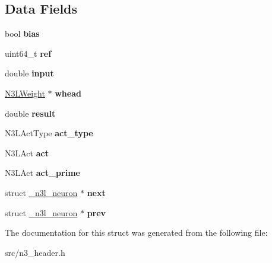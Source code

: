 \subsection*{Data Fields}
\begin{DoxyCompactItemize}
\item 
\mbox{\label{struct__n3l__neuron_a0f3291ff81ab13111e538622ab662069}} 
bool {\bfseries bias}
\item 
\mbox{\label{struct__n3l__neuron_aa0053e003b954df3b58853f003284958}} 
uint64\+\_\+t {\bfseries ref}
\item 
\mbox{\label{struct__n3l__neuron_ac896f5f8bd82c056cc61872120391048}} 
double {\bfseries input}
\item 
\mbox{\label{struct__n3l__neuron_ac9259a513822ea957c03430988adfa6a}} 
\hyperlink{struct__n3l__weight}{N3\+L\+Weight} $\ast$ {\bfseries whead}
\item 
\mbox{\label{struct__n3l__neuron_afc9c38f4676dbe2ead749f8b6c81f491}} 
double {\bfseries result}
\item 
\mbox{\label{struct__n3l__neuron_af424e7accb8d1d089b828a1de69e03a0}} 
N3\+L\+Act\+Type {\bfseries act\+\_\+type}
\item 
\mbox{\label{struct__n3l__neuron_a3ed17ddbe86d42ed6b7d31256b109262}} 
N3\+L\+Act {\bfseries act}
\item 
\mbox{\label{struct__n3l__neuron_a9c9de65191cb097fd7a71752c83fc3db}} 
N3\+L\+Act {\bfseries act\+\_\+prime}
\item 
\mbox{\label{struct__n3l__neuron_a55f1bc3d589d69c5a940d0cb497610c4}} 
struct \hyperlink{struct__n3l__neuron}{\+\_\+n3l\+\_\+neuron} $\ast$ {\bfseries next}
\item 
\mbox{\label{struct__n3l__neuron_a706ad4614fd4d1bd9a824f6ea8c0c9e5}} 
struct \hyperlink{struct__n3l__neuron}{\+\_\+n3l\+\_\+neuron} $\ast$ {\bfseries prev}
\end{DoxyCompactItemize}


The documentation for this struct was generated from the following file\+:\begin{DoxyCompactItemize}
\item 
src/n3\+\_\+header.\+h\end{DoxyCompactItemize}
